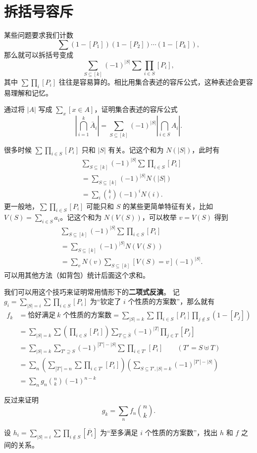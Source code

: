 \section{拆括号容斥}
    某些问题要求我们计数
    $$
    \sum (1-[P_1])(1-[P_2])\cdots (1-[P_k]),
    $$
    那么就可以拆括号变成
    $$
    \sum_{S\subseteq [k]} (-1)^{|S|}\sum \prod_{i\in S}[P_i],
    $$
    其中 $\sum\prod_i [P_i]$ 往往是容易算的。相比用集合表述的容斥公式，这种表述会更容易理解和记忆。
    \begin{exercise}
        通过将 $|A|$ 写成 $\sum_x [x\in A]$，证明集合表述的容斥公式
        $$
        \left|\bigcap_{i=1}^k \bar{A}_i\right|=\sum_{S\subseteq [k]}(-1)^{|S|}\left|\bigcap_{i\in S}A_i\right|.
        $$
    \end{exercise}

    很多时候 $\sum\prod_{i\in S}[P_i]$ 只和 $|S|$ 有关。记这个和为 $N(|S|)$，此时有
    $$
    \begin{aligned}
    &\sum_{S\subseteq [k]} (-1)^{|S|}\sum \prod_{i\in S}[P_i]\\
    &=\sum_{S\subseteq [k]}(-1)^{|S|}N(|S|)\\
    &=\sum_i\binom{k}{i}(-1)^i N(i).
    \end{aligned}
    $$
    更一般地，$\sum\prod_{i\in S}[P_i]$ 可能只和 $S$ 的某些更简单特征有关，比如 $V(S)=\sum_{i\in S}a_i$。记这个和为 $N(V(S))$，可以枚举 $v=V(S)$ 得到
    $$
    \begin{aligned}
        &\sum_{S\subseteq [k]} (-1)^{|S|}\sum \prod_{i\in S}[P_i]\\
        &=\sum_{S\subseteq [k]}(-1)^{|S|}N(V(S))\\
        &=\sum_v N(v)\sum_{S\subseteq [k]}[V(S)=v](-1)^{|S|}.
    \end{aligned}
    $$    
    可以用其他方法（如背包）统计后面这个求和。

    我们可以用这个技巧来证明常用情形下的\textbf{二项式反演}。
    记 $g_i=\sum_{|S|=i}\sum\prod_{i\in S}[P_i]$ 为“钦定了 $i$ 个性质的方案数”，那么就有
    $$
    \begin{aligned}
    f_k&=\text{恰好满足}\ k\text{ 个性质的方案数}=\sum_{|S|=k}\sum \prod_{i\in S}[P_i]\prod_{j\notin S}(1-[P_j])\\
    &=\sum_{|S|=k}\sum\left(\prod_{i\in S}[P_i]\right)\sum_{T\subseteq \bar S}(-1)^{|T|}\prod_{j\in T}[P_j]\\
    &=\sum_{|S|=k}\sum_{T'\supseteq S}(-1)^{|T'|-|S|}\sum\prod_{i\in T'}[P_i]\qquad(T'=S\uplus T)\\
    &=\sum_{n}\left(\sum_{|T'|=n}\sum\prod_{i\in T'}[P_i]\right)\left(\sum_{S\subseteq T',|S|=k}(-1)^{|T'|-|S|}\right)\\
    &=\sum_n g_n\binom{n}{k}(-1)^{n-k}
    \end{aligned}
    $$
    \begin{exercise}
        反过来证明
        $$
        g_k=\sum_n f_n\binom{n}{k}.
        $$
    \end{exercise}
    \begin{exercise}[另一个方向]
        设 $h_i=\sum_{|S|=i}\sum\prod_{i\notin S}[\overline{P_i}]$ 为“至多满足 $i$ 个性质的方案数”，找出 $h$ 和 $f$ 之间的关系。
    \end{exercise}
